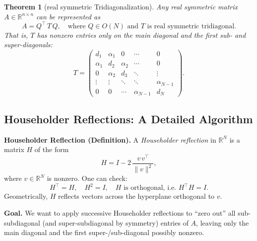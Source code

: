 \documentclass[letterpaper,11pt,oneside,reqno]{article}
\numberwithin{equation}{section}
\newtheorem{theorem}[proposition]{Theorem}
\theoremstyle{definition}
\begin{document}
\begin{theorem}[real symmetric Tridiagonalization]
\label{thm:tridiagonal}
Any real symmetric matrix \(A\in\mathbb{R}^{n\times n}\) can be represented as
\[
  A = Q^\top\, T\, Q,
  \quad
  \text{where } Q\in O(N)
  \text{ and } T\text{ is real symmetric tridiagonal.}
\]
That is, \(T\) has nonzero entries only on the main diagonal and the first sub- and super-diagonals:
\[
  T = \begin{pmatrix}
         d_1 & \alpha_1 & 0 & \cdots & 0\\
         \alpha_1 & d_2 & \alpha_2 & \cdots & 0\\
         0 & \alpha_2 & d_3 & \ddots & \vdots\\
         \vdots & \vdots & \ddots & \ddots & \alpha_{N-1}\\
         0 & 0 & \cdots & \alpha_{N-1} & d_N
       \end{pmatrix}.
\]
\end{theorem}

\subsection{Householder Reflections: A Detailed Algorithm}

\noindent
\textbf{Householder Reflection (Definition).}
A \emph{Householder reflection} in \(\mathbb{R}^N\) is a matrix \(H\) of the form
\[
  H = I - 2\,\frac{v\,v^\top}{\|v\|^2},
\]
where \(v\in\mathbb{R}^N\) is nonzero. One can check:
\[
  H^\top = H,\quad
  H^2 = I,\quad
  H\text{ is orthogonal, i.e.\ }H^\top H = I.
\]
Geometrically, \(H\) reflects vectors across the hyperplane orthogonal to \(v\).

\medskip
\noindent
\textbf{Goal.}
We want to apply successive Householder reflections to “zero out” all sub-subdiagonal (and super-subdiagonal by symmetry) entries of \(A\), leaving only the main diagonal and the first super-/sub-diagonal possibly nonzero.
\end{document}
